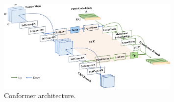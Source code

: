 \begin{figure}[t]
    \centering
    \includegraphics[width=0.8\textwidth]{fig/rel/images/conformer.pdf}
    \caption{Conformer architecture. \autocite{peng2021conformer}}
    \label{fig:rel_conformer}
\end{figure}